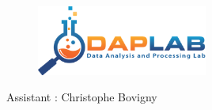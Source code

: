 \documentclass[11pt]{article}
\newcommand{\question}[1] %
{
\refstepcounter{questions} %
\par\noindent %
\phantomsection %
\addcontentsline{faq}{questions}{#1} %
\todo[inline, color=blue!40]{\textbf{#1}} %
\vspace{1em} %
}
\begin{document}
\begin{center}
 


\begin{figure}[h!]

  \centering
    \includegraphics[width=0.5\textwidth]{Images/DAPLab-Title.png}
     
\end{figure}
\end{center}


\begin{center} 
Assistant : Christophe Bovigny
\end{center}

\listofquestions %

\newpage %


% 
% 
% 
% 
% 
% 
% 
% 
% 
% 
\end{document}
